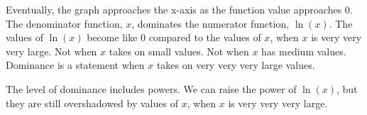 \documentclass{ximera}
\begin{document}
\begin{example}
\begin{image}
\end{image}






Eventually, the graph approaches the x-axis as the function value approaches $0$. \\


The denominator function, $x$, dominates the numerator function, $\ln(x)$.   The values of $\ln(x)$ become like $0$ compared to the values of $x$, when $x$ is very very very large. Not when $x$ takes on small values.  Not when $x$ has medium values.  Dominance is a statement when $x$ takes on very very very large values.




\end{example}







The level of dominance includes powers.  We can raise the power of $\ln(x)$, but they are still overshadowed by values of $x$, when $x$ is very very very large. \\
\end{document}
